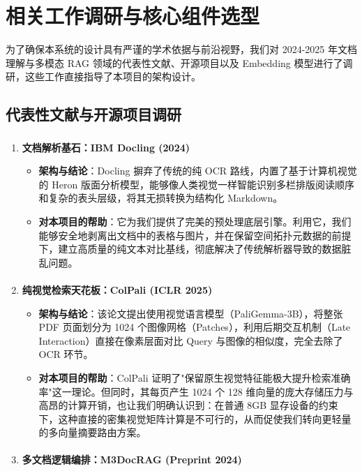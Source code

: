 ﻿\documentclass[UTF8, heading=true]{ctexart}
\newcommand{\upcite}[1]{\textsuperscript{\textsuperscript{\cite{#1}}}}
\begin{document}
\section{相关工作调研与核心组件选型}

为了确保本系统的设计具有严谨的学术依据与前沿视野，我们对 2024-2025 年文档理解与多模态 RAG 领域的代表性文献、开源项目以及 Embedding 模型进行了调研，这些工作直接指导了本项目的架构设计。

\subsection{代表性文献与开源项目调研}

\begin{enumerate}
    \item \textbf{文档解析基石：IBM Docling (2024)\upcite{2}}

    \begin{itemize}
        \item \textbf{架构与结论}：Docling 摒弃了传统的纯 OCR 路线，内置了基于计算机视觉的 Heron 版面分析模型，能够像人类视觉一样智能识别多栏排版阅读顺序和复杂的表头层级，将其无损转换为结构化 Markdown。
        \item \textbf{对本项目的帮助}：它为我们提供了完美的预处理底层引擎。利用它，我们能够安全地剥离出文档中的表格与图片，并在保留空间拓扑元数据的前提下，建立高质量的纯文本对比基线，彻底解决了传统解析器导致的数据脏乱问题。
    \end{itemize}

    \item \textbf{纯视觉检索天花板：ColPali (ICLR 2025)\upcite{3}}

    \begin{itemize}
        \item \textbf{架构与结论}：该论文提出使用视觉语言模型（PaliGemma-3B），将整张 PDF 页面划分为 1024 个图像网格（Patches），利用后期交互机制（Late Interaction）直接在像素层面对比 Query 与图像的相似度，完全去除了 OCR 环节。
        \item \textbf{对本项目的帮助}：ColPali 证明了"保留原生视觉特征能极大提升检索准确率"这一理论。但同时，其每页产生 1024 个 128 维向量的庞大存储压力与高昂的计算开销，也让我们明确认识到：在普通 8GB 显存设备的约束下，这种直接的密集视觉矩阵计算是不可行的，从而促使我们转向更轻量的多向量摘要路由方案。
    \end{itemize}

    \item \textbf{多文档逻辑编排：M3DocRAG (Preprint 2024)\upcite{6}}


\end{enumerate}
\end{document}
